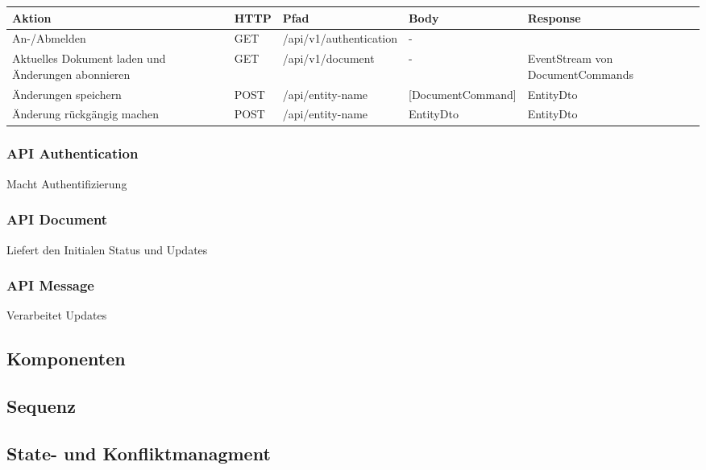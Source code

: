 \begin{tabularx}{\textwidth}{|p{4.75cm}|l|l|l|p{3.15cm}|}
    \hline
    \textbf{Aktion}            & \textbf{HTTP} & \textbf{Pfad}        & \textbf{Body} & \textbf{Response} \\
    \hline
    An-/Abmelden        & GET           & /api/v1/authentication     & -             &        \\
    \hline
    Aktuelles Dokument laden und Änderungen abonnieren    & GET           & /api/v1/document  & -             & EventStream von DocumentCommands     \\
    \hline
    Änderungen speichern    & POST          & /api/entity-name     & [DocumentCommand]     & EntityDto         \\
    \hline
    Änderung rückgängig machen & POST           & /api/entity-name     & EntityDto     & EntityDto         \\
    \hline
\end{tabularx}\label{tab:apimethods}

\subsubsection{API Authentication}

Macht Authentifizierung

\subsubsection{API Document}

Liefert den Initialen Status und Updates

\subsubsection{API Message}

Verarbeitet Updates

\clearpage

\subsection{Komponenten}

\subsection{Sequenz}

\subsection{State- und Konfliktmanagment}
